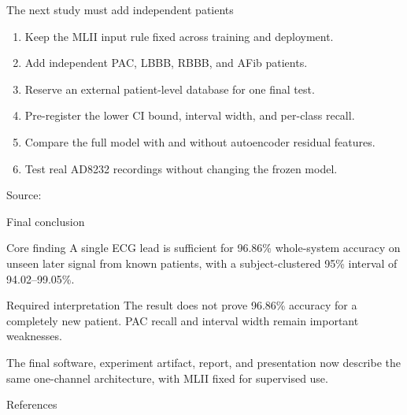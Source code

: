 \documentclass[aspectratio=169,11pt]{beamer}
\newcommand{\source}[1]{\vfill{\tiny\color{gray!80}Source: \cite{#1}}}
\begin{document}
\begin{frame}{The next study must add independent patients}
\begin{enumerate}
  \item Keep the MLII input rule fixed across training and deployment.
  \item Add independent PAC, LBBB, RBBB, and AFib patients.
  \item Reserve an external patient-level database for one final test.
  \item Pre-register the lower CI bound, interval width, and per-class recall.
  \item Compare the full model with and without autoencoder residual features.
  \item Test real AD8232 recordings without changing the frozen model.
\end{enumerate}
\source{dechazal2004heartbeat}
\end{frame}

\begin{frame}{Final conclusion}
\begin{block}{Core finding}
A single ECG lead is sufficient for 96.86\% whole-system accuracy on unseen
later signal from known patients, with a subject-clustered 95\% interval of
94.02--99.05\%.
\end{block}
\begin{alertblock}{Required interpretation}
The result does not prove 96.86\% accuracy for a completely new patient. PAC
recall and interval width remain important weaknesses.
\end{alertblock}
\vspace{0.25cm}
The final software, experiment artifact, report, and presentation now describe
the same one-channel architecture, with MLII fixed for supervised use.
\end{frame}

\begin{frame}[allowframebreaks]{References}
\footnotesize


\end{frame}
\end{document}
